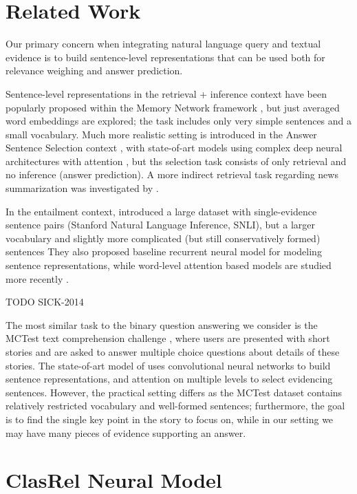\documentclass[11pt]{article}
\begin{document}
\section{Related Work}
\label{sec:relwork}

Our primary concern when integrating natural language query and
textual evidence is to build sentence-level representations that
can be used both for relevance weighing and answer prediction.

Sentence-level representations in the retrieval + inference context have been
popularly proposed within the Memory Network framework \cite{MemNN},
but just averaged word embeddings are explored; the task includes
only very simple sentences and a small vocabulary.
Much more realistic setting is introduced in the Answer Sentence Selection
context \cite{AnsselWang} \cite{sps}, with state-of-art models using complex
deep neural architectures with attention \cite{attnpooling}, but ths selection
task consists of only retrieval and no inference (answer prediction).
A more indirect retrieval task regarding news summarization was investigated
by \cite{AttSum}.

In the entailment context, \cite{SNLI} introduced a large dataset
with single-evidence sentence pairs (Stanford Natural Language Inference, SNLI),
but a larger vocabulary and
slightly more complicated (but still conservatively formed) sentences
They also proposed baseline recurrent neural model for modeling
sentence representations, while word-level attention based models
are studied more recently \cite{SNLIattn} \cite{LSTMMR}.

TODO SICK-2014

The most similar task to the binary question answering we consider
is the MCTest text comprehension challenge \cite{MCTest}, where
users are presented with short stories and are asked to answer multiple
choice questions about details of these stories.  The state-of-art model
of \cite{HABCNN} uses convolutional neural networks to build sentence
representations, and attention on multiple levels to select evidencing
sentences.
However, the practical setting differs as the MCTest dataset contains
relatively restricted vocabulary and well-formed sentences; furthermore,
the goal is to find the single key point in the story to focus on, while
in our setting we may have many pieces of evidence supporting an answer.

\section{ClasRel Neural Model}
\label{sec:clasrel}
\end{document}
